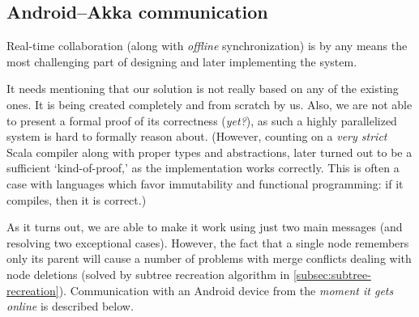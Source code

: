 %
%
%
%
%

\subsection{Android--Akka communication}
\label{subsec:android-akka-comm}

Real-time collaboration (along with \emph{offline} synchronization) is by any means the most challenging part of designing and later implementing the system.

It needs mentioning that our solution is not really based on any of the existing ones. It is being created completely and from scratch by us. Also, we are not able to present a formal proof of its correctness (\emph{yet?}), as such a highly parallelized system is hard to formally reason about. (However, counting on a \emph{very strict} Scala compiler along with proper types and abstractions, later turned out to be a sufficient `kind-of-proof,' as the implementation works correctly. This is often a case with languages which favor immutability and functional programming: if it compiles, then it is correct.)

As it turns out, we are able to make it work using just two main messages (and resolving two exceptional cases). However, the fact that a single node remembers only its parent will cause a number of problems with merge conflicts dealing with node deletions (solved by subtree recreation algorithm in \cref{subsec:subtree-recreation}). Communication with an Android device from the \emph{moment it gets online} is described below.


